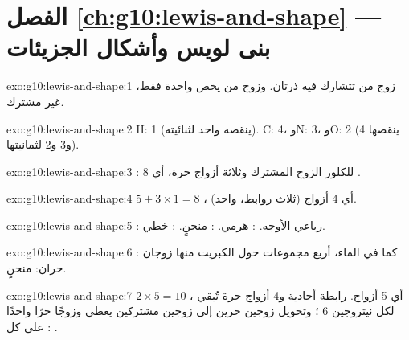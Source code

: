 \section*{الفصل \ref{ch:g10:lewis-and-shape} --- بنى لويس وأشكال الجزيئات}

\begin{solution}{exo:g10:lewis-and-shape:1}
زوج من  تتشارك فيه ذرتان. وزوج من  يخص  واحدة
فقط، غير مشترك.
\end{solution}

\begin{solution}{exo:g10:lewis-and-shape:2}
H: 1 (ينقصه  واحد لثنائيته). C: 4، وN: 3، وO: 2 (ينقصها 4 و3 و2
 لثمانيتها).
\end{solution}

\begin{solution}{exo:g10:lewis-and-shape:3}
: للكلور الزوج المشترك وثلاثة أزواج
حرة، أي 8 .
\end{solution}

\begin{solution}{exo:g10:lewis-and-shape:4}
$5 + 3 \times 1 = 8$ ، أي 4 أزواج (ثلاث روابط،  واحد).
\end{solution}

\begin{solution}{exo:g10:lewis-and-shape:5}
: رباعي الأوجه. : هرمي. : منحنٍ. :
خطي.
\end{solution}

\begin{solution}{exo:g10:lewis-and-shape:6}
: كما في الماء، أربع مجموعات حول الكبريت
منها زوجان حران: منحنٍ.
\end{solution}

\begin{solution}{exo:g10:lewis-and-shape:7}
$2 \times 5 = 10$ ، أي 5 أزواج. رابطة أحادية و4 أزواج حرة تُبقي لكل
نيتروجين 6 ؛ وتحويل زوجين حرين إلى زوجين مشتركين يعطي 
وزوجًا حرًا واحدًا على كل :
.
\end{solution}

